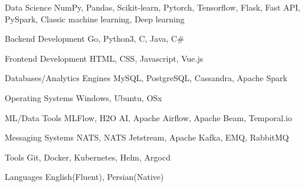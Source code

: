 

\begin{cvskills}

  \cvskill
    {Data Science} %
    {NumPy, Pandas, Scikit‐learn, Pytorch, Tensorflow, Flask, Fast API, PySpark, Classic machine learning, Deep learning} %

  \cvskill
    {Backend Development} %
    {Go, Python3, C, Java, C\#} %

  \cvskill
    {Frontend Development} %
    {HTML, CSS, Javascript, Vue.js} %

  \cvskill
    {Databases/Analytics Engines} %
    {MySQL, PostgreSQL, Cassandra, Apache Spark} %

  \cvskill
    {Operating Systems} %
    {Windows, Ubuntu, OSx} %

  \cvskill
    {ML/Data Tools} %
    {MLFlow, H2O AI, Apache Airflow, Apache Beam, Temporal.io} %

  \cvskill
    {Messaging Systems} %
    {NATS, NATS Jetstream, Apache Kafka, EMQ, RabbitMQ} %

  \cvskill
    {Tools} %
    {Git, Docker, Kubernetes, Helm, Argocd} %

  \cvskill
    {Languages} %
    {English(Fluent), Persian(Native)} %

\end{cvskills}
